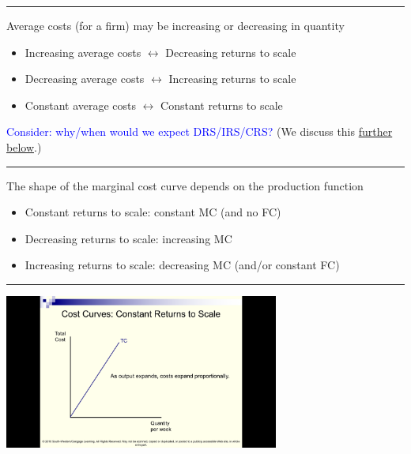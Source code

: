 \documentclass[]{article}
\begin{document}
\begin{center}\rule{0.5\linewidth}{\linethickness}\end{center}

Average costs (for a firm) may be increasing or decreasing in quantity

\bigskip

\begin{itemize}
\item
  Increasing average costs \(\leftrightarrow\) Decreasing returns to
  scale
\item
  Decreasing average costs \(\leftrightarrow\) Increasing returns to
  scale
\item
  Constant average costs \(\leftrightarrow\) Constant returns to scale
\end{itemize}

\bigskip

\textcolor{blue}{Consider: why/when would we expect DRS/IRS/CRS?} (We
discuss this \protect\hyperlink{ux5cux23IRS-DRS-reasons}{further
below}.)

\begin{center}\rule{0.5\linewidth}{\linethickness}\end{center}

The shape of the marginal cost curve depends on the production function

\begin{itemize}
\item
  Constant returns to scale: constant MC (and no FC)
\item
  Decreasing returns to scale: increasing MC
\item
  Increasing returns to scale: decreasing MC (and/or constant FC)
\end{itemize}

\begin{center}\rule{0.5\linewidth}{\linethickness}\end{center}

\includegraphics[height=2in]{picsfigs/crsTCcurve.png}
\end{document}
